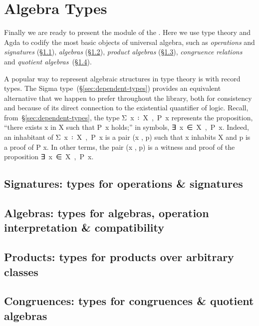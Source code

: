 \section{Algebra Types}\label{sec:algebra-types}
Finally we are ready to present the  module of the \agdaualib. Here we use type theory and Agda to codify the most basic objects of universal algebra, such as \emph{operations} and \emph{signatures} (\S\ref{sec:oper-sign}), \emph{algebras} (\S\ref{sec:algebras}), \emph{product algebras} (\S\ref{sec:product-algebras}), \emph{congruence relations} and \emph{quotient algebras}~(\S\ref{congruences}).

A popular way to represent algebraic structures in type theory is with record types. The Sigma type~(\S\ref{sec:dependent-types}) provides an equivalent alternative that we happen to prefer throughout the library, both for consistency and because of its direct connection to the existential quantifier of logic. Recall, from~\S\ref{sec:dependent-types}, the type \ad Σ~\ab x~\af ꞉~\ab X~\af ,~\ab P~\ab x represents the proposition, ``there exists \ab x in \ab X such that \ab P~\ab x holds;'' in symbols, \as ∃~\ab x~\af ∈~\ab X~\af ,~\ab P~\ab x.  Indeed, an inhabitant of  \ad Σ~\ab x~\af ꞉~\ab X~\af ,~\ab P~\ab x is a pair (\ab x , \ab p) such that \ab x inhabits \ab X and \ab p is a proof of \ab P \ab x. In other terms, the pair (\ab x , \ab p) is a witness and proof of the proposition \as ∃~\ab x~\af ∈~\ab X~\af ,~\ab P~\ab x.

\subsection{Signatures: types for operations \& signatures}\label{sec:oper-sign}


\subsection{Algebras: types for algebras, operation interpretation \& compatibility}\label{sec:algebras}


\subsection{Products: types for products over arbitrary classes}\label{sec:product-algebras}


\subsection{Congruences: types for congruences \& quotient algebras}\label{congruences}

